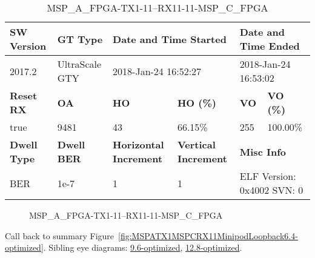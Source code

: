 \begin{table}[h]
\centering
\caption{MSP\_A\_FPGA-TX1-11--RX11-11-MSP\_C\_FPGA}
\label{tab:MSPAFPGATX111RX1111MSPCFPGA6.4-optimized}
\begin{tabular}{@{}|l|l|l|l|l|l|@{}}
\toprule
\textbf{SW Version}                & \textbf{GT Type}   & \multicolumn{2}{l|}{\textbf{Date and Time Started}}            & \multicolumn{2}{l|}{\textbf{Date and Time Ended}}        \\ \midrule
2017.2                       & UltraScale GTY          & \multicolumn{2}{l|}{2018-Jan-24 16:52:27}                   & \multicolumn{2}{l|}{2018-Jan-24 16:53:02}               \\ \midrule
\textbf{Reset RX}                  & \textbf{OA} & \textbf{HO}   & \textbf{HO (\%)} & \textbf{VO} & \textbf{VO (\%)} \\ \midrule
true & 9481        & 43          & 66.15\%        & 255        & 100.00\%       \\ \midrule
\textbf{Dwell Type}                & \textbf{Dwell BER} & \textbf{Horizontal Increment} & \textbf{Vertical Increment}    & \multicolumn{2}{l|}{\textbf{Misc Info}}                  \\ \midrule
BER                            & 1e-7        & 1        & 1           & \multicolumn{2}{l|}{ELF Version: 0x4002 SVN: 0}                         \\ \bottomrule
\end{tabular}
\end{table}

\begin{figure}[h]
\caption{MSP\_A\_FPGA-TX1-11--RX11-11-MSP\_C\_FPGA} \label{fig:MSPAFPGATX111RX1111MSPCFPGA6.4-optimized}
\end{figure}

Call back to summary Figure~\ref{fig:MSPATX1MSPCRX11MinipodLoopback6.4-optimized}.
Sibling eye diagrams: \hyperref[sec:MSPAFPGATX111RX1111MSPCFPGA9.6-optimized]{9.6-optimized}, \hyperref[sec:MSPAFPGATX111RX1111MSPCFPGA12.8-optimized]{12.8-optimized}.

\clearpage
\newpage

